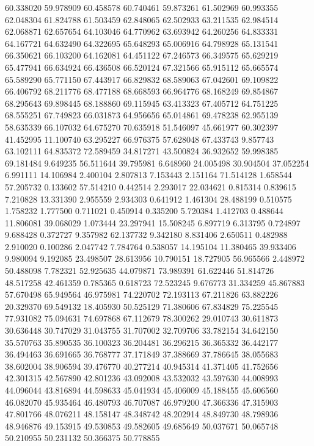 60.338020
59.978909
60.458578
60.740461
59.873261
61.502969
60.993355
62.048304
61.824788
61.503459
62.848065
62.502933
63.211535
62.984514
62.068871
62.657654
64.103046
64.770962
63.693942
64.260256
64.833331
64.167721
64.632490
64.322695
65.648293
65.006916
64.798928
65.131541
66.350621
66.103200
64.162081
64.451122
67.246573
66.349575
65.629219
65.477941
66.634924
66.436508
66.520124
67.321566
65.915112
65.665574
65.589290
65.771150
67.443917
66.829832
68.589063
67.042601
69.109822
66.406792
68.211776
68.477188
68.668593
66.964776
68.168249
69.854867
68.295643
69.898445
68.188860
69.115945
63.413323
67.405712
64.751225
68.555251
67.749823
66.031873
64.956656
65.014861
69.478238
62.955139
58.635339
66.107032
64.675270
70.635918
51.546097
45.661977
60.302397
41.452995
11.100740
63.295227
66.976375
57.628048
67.433743
9.857743
63.102111
64.835372
72.589459
34.817271
43.500824
36.932652
59.998385
69.181484
9.649235
56.511644
39.795981
6.648960
24.005498
30.904504
37.052254
6.991111
14.106984
2.400104
2.807813
7.153443
2.151164
71.514128
1.658544
57.205732
0.133602
57.514210
0.442514
2.293017
22.034621
0.815314
0.839615
7.210828
13.331390
2.955559
2.934303
0.641912
1.461304
28.488199
0.510575
1.758232
1.777500
0.711021
0.450914
0.335200
5.720384
1.412703
0.488644
11.806081
39.068029
1.073444
23.297941
15.508245
6.897719
6.313795
0.724897
9.688428
0.372727
9.357982
62.137732
9.342180
8.831406
2.650511
0.482988
2.910020
0.100286
2.047742
7.784764
0.538057
14.195104
11.380465
39.933406
9.980094
9.192085
23.498507
28.613956
10.790151
18.727905
56.965566
2.448972
50.488098
7.782321
52.925635
44.079871
73.989391
61.622446
51.814726
48.517258
42.461359
0.785365
0.618723
72.523245
9.676773
31.334259
45.867883
57.670498
65.949564
46.975981
74.220702
72.193113
67.211826
63.882226
20.329370
69.549132
18.405930
50.525129
71.380606
67.834829
75.225545
77.931082
75.094631
74.697868
67.112679
78.300262
29.010743
30.611873
30.636448
30.747029
31.043755
31.707002
32.709706
33.782154
34.642150
35.570763
35.890535
36.100323
36.204481
36.296215
36.365332
36.442177
36.494463
36.691665
36.768777
37.171849
37.388669
37.786645
38.055683
38.602004
38.906594
39.476770
40.277214
40.945314
41.371405
41.752656
42.301315
42.567890
42.801236
43.092008
43.532032
43.597630
44.008993
44.096044
43.816894
44.598633
45.041934
45.406009
45.188455
45.606560
46.082070
45.935464
46.480793
46.707087
46.979200
47.366336
47.315903
47.801766
48.076211
48.158147
48.348742
48.202914
48.849730
48.798936
48.946876
49.153915
49.530853
49.582605
49.685649
50.037671
50.065748
50.210955
50.231132
50.366375
50.778855
